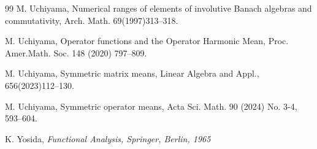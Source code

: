 \documentclass[reqno]{amsart}
\theoremstyle{definition}
\theoremstyle{remark}
\begin{document}
\begin{thebibliography}{99}
M. Uchiyama,  Numerical ranges of elements of involutive Banach algebras and commutativity, Arch. Math.
69(1997)313--318.

%
%
%
%

M. Uchiyama, Operator functions and the Operator Harmonic Mean, 
Proc. Amer.Math. Soc. 148 (2020) 797--809.
%
%

M. Uchiyama, Symmetric matrix means, Linear Algebra and Appl., 656(2023)112--130.

M. Uchiyama, Symmetric operator means, Acta Sci. Math. 90 (2024) No. 3-4, 593--604.

K. Yosida, \it Functional Analysis, \rm Springer, Berlin, 1965  
\end{thebibliography}



 
 
\end{document}
